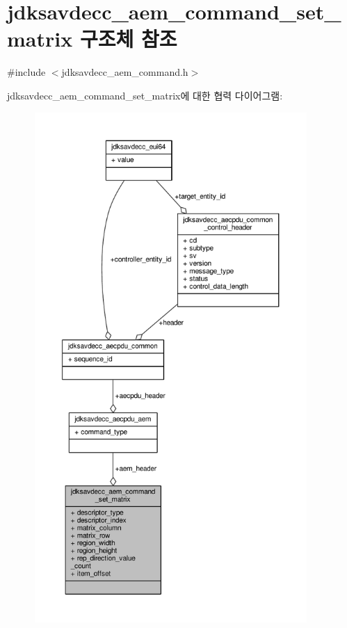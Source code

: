 \hypertarget{structjdksavdecc__aem__command__set__matrix}{}\section{jdksavdecc\+\_\+aem\+\_\+command\+\_\+set\+\_\+matrix 구조체 참조}
\label{structjdksavdecc__aem__command__set__matrix}


{\ttfamily \#include $<$jdksavdecc\+\_\+aem\+\_\+command.\+h$>$}



jdksavdecc\+\_\+aem\+\_\+command\+\_\+set\+\_\+matrix에 대한 협력 다이어그램\+:
\nopagebreak
\begin{figure}[H]
\begin{center}
\leavevmode
\includegraphics[height=550pt]{structjdksavdecc__aem__command__set__matrix__coll__graph}
\end{center}
\end{figure}
